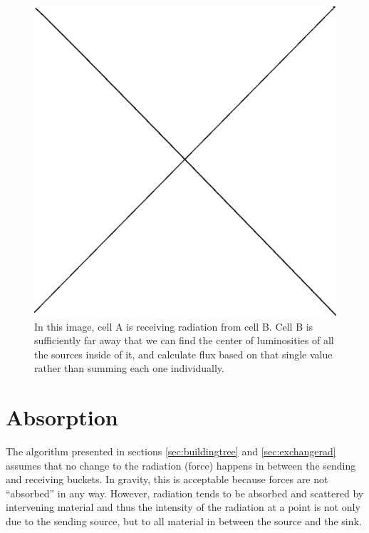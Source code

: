 \begin{figure}
\includegraphics[width=\textwidth]{graphics/placeholder.eps}
\caption[The exchange of radiation.]{In this image, cell A is receiving radiation from cell B. Cell B is sufficiently far away that we can find the center of luminosities of all the sources inside of it, and calculate flux based on that single value rather than summing each one individually.}
\label{fig:radexchange}
\end{figure}

\section{Absorption}
\label{sec:absorption}

The algorithm presented in sections \ref{sec:buildingtree} and \ref{sec:exchangerad} assumes that no change to the radiation (force) happens in between the sending and receiving buckets. In gravity, this is acceptable because forces are not ``absorbed'' in any way. However, radiation tends to be absorbed and scattered by intervening material and thus the intensity of the radiation at a point is not only due to the sending source, but to all material in between the source and the sink.

